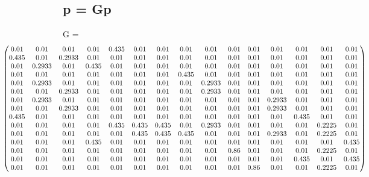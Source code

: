 \documentclass[a4paper,11pt]{article}
\newcommand{\lt}{\latintext}
\begin{document}
	\subsection{\lt p = Gp}
	\normalsize{\lt G =} 
\begin{equation*}
\hspace{-3cm}	
\setcounter{MaxMatrixCols}{20}
\begin{pmatrix}
0.01 & 0.01 & 0.01 & 0.01 & 0.435 & 0.01 & 0.01 & 0.01 & 0.01 & 0.01 & 0.01 & 0.01 & 0.01 & 0.01 & 0.01 \\
        0.435 & 0.01 & 0.2933 & 0.01 & 0.01 & 0.01 & 0.01 & 0.01 & 0.01 & 0.01 & 0.01 & 0.01 & 0.01 & 0.01 & 0.01 \\
        0.01 & 0.2933 & 0.01 & 0.435 & 0.01 & 0.01 & 0.01 & 0.01 & 0.01 & 0.01 & 0.01 & 0.01 & 0.01 & 0.01 & 0.01 \\
        0.01 & 0.01 & 0.01 & 0.01 & 0.01 & 0.01 & 0.01 & 0.435 & 0.01 & 0.01 & 0.01 & 0.01 & 0.01 & 0.01 & 0.01 \\
        0.01 & 0.2933 & 0.01 & 0.01 & 0.01 & 0.01 & 0.01 & 0.01 & 0.2933 & 0.01 & 0.01 & 0.01 & 0.01 & 0.01 & 0.01 \\
        0.01 & 0.01 & 0.2933 & 0.01 & 0.01 & 0.01 & 0.01 & 0.01 & 0.2933 & 0.01 & 0.01 & 0.01 & 0.01 & 0.01 & 0.01 \\
        0.01 & 0.2933 & 0.01 & 0.01 & 0.01 & 0.01 & 0.01 & 0.01 & 0.01 & 0.01 & 0.01 & 0.2933 & 0.01 & 0.01 & 0.01 \\
        0.01 & 0.01 & 0.2933 & 0.01 & 0.01 & 0.01 & 0.01 & 0.01 & 0.01 & 0.01 & 0.01 & 0.2933 & 0.01 & 0.01 & 0.01 \\
        0.435 & 0.01 & 0.01 & 0.01  &0.01 & 0.01 & 0.01 & 0.01 & 0.01 & 0.01 & 0.01 & 0.01 & 0.435 & 0.01 & 0.01 \\
        0.01 & 0.01 & 0.01 & 0.01 & 0.435 & 0.435 & 0.435 & 0.01 & 0.2933 & 0.01 & 0.01 & 0.01 & 0.01 & 0.2225 & 0.01\\ 
        0.01 & 0.01 & 0.01 & 0.01 & 0.01 & 0.435 & 0.435 & 0.435 & 0.01 & 0.01 & 0.01 & 0.2933 & 0.01 & 0.2225 & 0.01 \\
        0.01 & 0.01 & 0.01 & 0.435 & 0.01 & 0.01 & 0.01 & 0.01 & 0.01 & 0.01 & 0.01 & 0.01 & 0.01 & 0.01 & 0.435 \\
        0.01 & 0.01 & 0.01 & 0.01 & 0.01 & 0.01 & 0.01 & 0.01 & 0.01 & 0.86 & 0.01 & 0.01 & 0.01 & 0.2225 & 0.01 \\
        0.01 & 0.01 & 0.01 & 0.01 & 0.01 & 0.01 & 0.01 & 0.01 & 0.01 & 0.01 & 0.01 & 0.01 & 0.435 & 0.01 & 0.435 \\
0.01 & 0.01 & 0.01 & 0.01 & 0.01 & 0.01 & 0.01 & 0.01 & 0.01 & 0.01 & 0.86 & 0.01 & 0.01 & 0.2225 & 0.01

\end{pmatrix}
\end{equation*}
\end{document}
